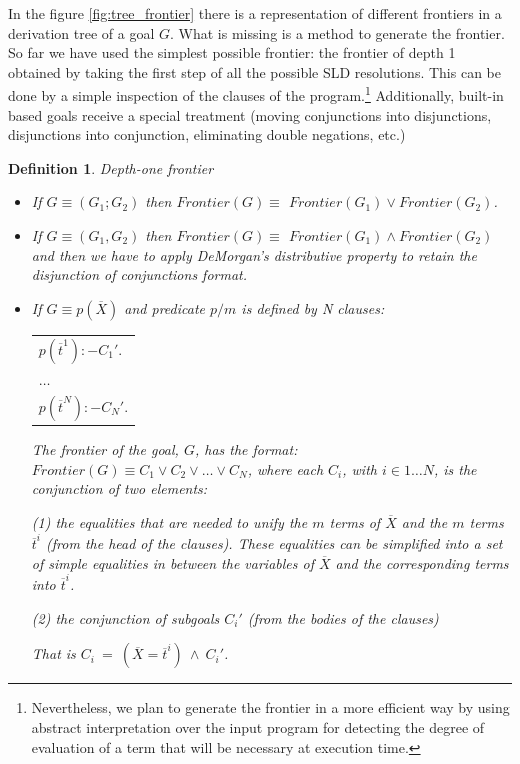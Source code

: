 \documentclass{tlp}
\newtheorem{definition}{Definition} %
\begin{document}

In the figure \ref{fig:tree_frontier} there is a representation of
different frontiers in a derivation tree of a goal $G$. What is
missing is a method to generate the frontier. So far we have used the
simplest possible frontier: the frontier of depth 1 obtained by taking
the first step of all the possible SLD resolutions. This can be done
by a simple inspection of the clauses of the
program.\footnote{Nevertheless, we plan to generate the frontier in a
more efficient way by using abstract interpretation over the input
program for detecting the degree of evaluation of a term that will be
necessary at execution time.} Additionally, built-in based goals
receive a special treatment (moving conjunctions into disjunctions,
disjunctions into conjunction, eliminating double negations, etc.)
\begin{definition}{\em Depth-one frontier}

    \begin{itemize} 

\item If $G \equiv (G_1;G_2) $ then $Frontier(G) \equiv$
$Frontier(G_1) \vee Frontier(G_2)$.

\item If $G \equiv (G_1,G_2) $ then $Frontier(G) \equiv$
  $Frontier(G_1) \wedge Frontier(G_2)$ and then we have to apply
  DeMorgan's distributive property to retain the disjunction
  of conjunctions format.
  
\item If $G \equiv p( \overline{X}) $ and 
  predicate $p/m$ is defined by N clauses: 

\begin{center}
\begin{tabular}{l}
$p( \overline{t}^1):- C_1' .$ \\
$\ldots$ \\
$p( \overline{t}^N):- C_N' .$ \\
\end{tabular}
\end{center}

The frontier of the goal, $G$, has the format: $Frontier(G) \equiv C_1
\vee C_2 \vee \ldots \vee C_N$, where each $C_i$, with $i \in 1 \ldots
N$, is the conjunction of two elements: 

(1) the equalities that are needed to unify the $m$ terms of
$\overline{X}$ and the $m$ terms $\overline{t}^i$ (from the head of
the clauses). These equalities can be simplified into a set of simple
equalities in between the variables of $\overline{X}$ and the
corresponding terms into $\overline{t}^i$.

(2) the conjunction of subgoals $C_i'$ (from the bodies of the clauses)

That is  $C_i~=~(\overline{X} = \overline{t}^i)~\wedge~C_i'$.

    \end{itemize}

\end{definition}
\end{document}
